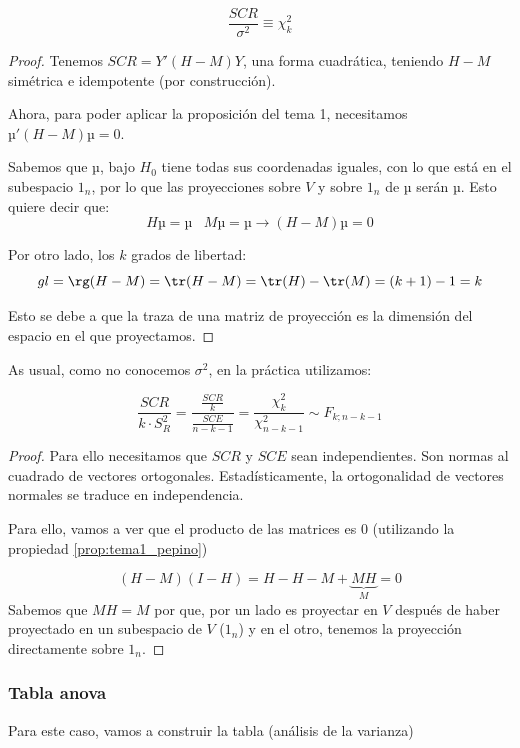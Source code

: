 \begin{prop}[Distribución SCR en $H_0:∀i\;β_i=0$]

\[
\frac{SCR}{σ^2} \equiv \chi^2_{k}
\]
\end{prop}
\begin{proof}
Tenemos $SCR = Y'(H-M)Y$, una forma cuadrática, teniendo $H-M$ simétrica e idempotente (por construcción).

Ahora, para poder aplicar la proposición del tema 1, necesitamos $µ'(H-M)µ = 0$.

Sabemos que $µ$, bajo $H_0$ tiene todas sus coordenadas iguales, con lo que está en el subespacio $1_n$, por lo que las proyecciones sobre $V$ y sobre $1_n$ de $µ$ serán $µ$. Esto quiere decir que:
\[ Hµ = µ \;\;\; Mµ = µ \to (H-M)µ=0\]


Por otro lado, los $k$ grados de libertad:
\[
gl = \rg(H-M) = \tr(H-M) = \tr(H) - \tr(M) = (k+1)-1 = k
\]

Esto se debe a que la traza de una matriz de proyección es la dimensión del espacio en el que proyectamos.

\end{proof}

As usual, como no conocemos $σ^2$, en la práctica utilizamos:
\begin{prop}
\label{prop:estad_contr_regresion}
\[
\frac{SCR}{k·S_R^2} = \frac{\displaystyle\frac{SCR}{k}}{\displaystyle\frac{SCE}{n-k-1}} = \frac{\chi^2_k}{\chi^2_{n-k-1}}\sim F_{k;n-k-1}
\]
\end{prop}
\begin{proof}
Para ello necesitamos que $SCR$ y $SCE$ sean independientes. Son normas al cuadrado de vectores ortogonales. Estadísticamente, la ortogonalidad de vectores normales se traduce en independencia.

Para ello, vamos a ver que el producto de las matrices es 0 (utilizando la propiedad \ref{prop:tema1_pepino})

\label{prop:SCRIndepSCE}
\[
(H-M)(I-H) = H-H-M+\underbrace{MH}_{M} = 0
\]
Sabemos que $MH=M$ por que, por un lado es proyectar en $V$ después de haber proyectado en un subespacio de $V$ ($1_n$) y en el otro, tenemos la proyección directamente sobre $1_n$.

\end{proof}

\subsubsection{Tabla anova}
Para este caso, vamos a construir la tabla  (análisis de la varianza)

